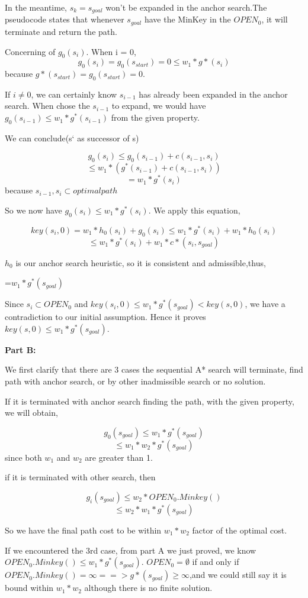 \documentclass[12pt, letterpaper]{article}
\begin{document}
In the meantime, $ s_k=s_{goal} $ won't be expanded in the anchor search.The pseudocode states that whenever $ s_{goal} $ have the MinKey in the $ OPEN_0 $, it will terminate and return the path.

Concerning of $ g_0(s_i) $. When i = 0,
$$ g_0(s_i) = g_0(s_{start})=0 \leq w_1 * g*(s_i)$$
because $g*(s_{start})=g_0(s_{start})=0$.

If $i \neq 0$, we can certainly know $ s_{i-1} $ has already been expanded in the anchor search. When chose the $ s_{i-1} $ to expand, we would have $g_0(s_{i-1}) \leq w_1 * g^*(s_{i-1})$ from the given property.

We can conclude(s` as successor of s)

$$g_0(s_i) \leq g_0(s_{i-1})+ c(s_{i-1},s_i)$$
$$\leq w_1 * (g^*(s_{i-1})+ c(s_{i-1},s_i))$$
$$=w_1*g^*(s_i)$$
because $ s_{i-1},s_i \subset optimal path$

So we now have $g_0(s_i) \leq w_1*g^*(s_i)$. We apply this equation,

$$key(s_i,0)= w_1*h_0(s_i)+g_0(s_i) \leq w_1 * g^*(s_i) +  w_1 * h_0(s_i)$$
$$ \leq w_1 * g^*(s_i) +  w_1 *c*(s_i,s_{goal})$$

$h_0$ is our anchor search heuristic, so it is consistent and admissible,thus,

=$  w_1*g^*(s_{goal}) $

Since $ s_i \subset OPEN_0$ and $key(s_i,0) \leq w_1*g^*(s_{goal}) < key(s,0)$, we have a contradiction to our initial assumption. Hence it proves  $ key(s,0) \leq w_1 * g^*(s_{goal}) $.

\bigskip

\noindent \textbf{Part B:}

\noindent We first clarify that there are 3 cases the sequential A* search will terminate, find path with anchor search, or by other inadmissible search or no solution.
 
\medskip

\noindent If it is terminated with anchor search finding the path, with the given property, we will obtain,

$$g_0(s_{goal}) \leq w_1 * g^*(s_{goal})$$
$$\leq w_1 * w_2 * g^*(s_{goal})$$ since both $ w_1 $ and $ w_2 $ are greater than 1.

\medskip

\noindent if it is terminated with other search, then

$$g_i(s_{goal}) \leq w_2 * OPEN_0.Minkey()$$
$$\leq w_2*w_1*g^*(s_{goal})$$

So we have the final path cost to be within $ w_1*w_2 $ factor of the optimal cost.

If we encountered the 3rd case, from part A we just proved, we know $ OPEN_0.Minkey() \leq w_1 * g^*(s_{goal}) $. $OPEN_0=\emptyset$ if and only if $OPEN_0.Minkey() = \infty ==> g*(s_{goal}) \geq \infty$,and we could still say it is bound within $ w_1*w_2 $ although there is no finite solution. 
\end{document}
